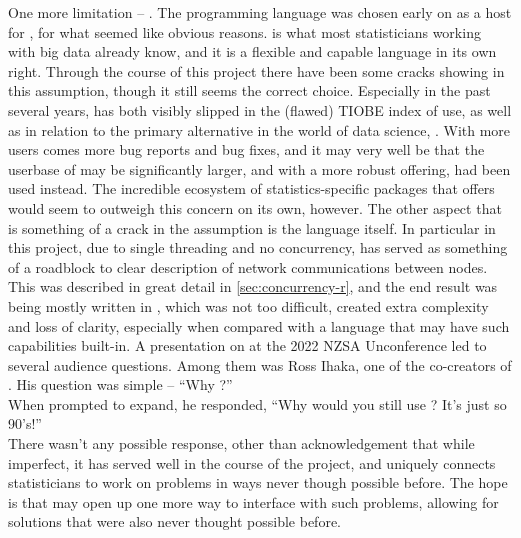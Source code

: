 One more limitation -- \R{}.
The \R{} programming language was chosen early on as a host for \lsr{}, for what seemed like obvious reasons.
\R{} is what most statisticians working with big data already know, and it is a flexible and capable language in its own right.
Through the course of this project there have been some cracks showing in this assumption, though it still seems the correct choice.
Especially in the past several years, \R{} has both visibly slipped in the (flawed) TIOBE index of use, as well as in relation to the primary alternative in the world of data science, .
With more users comes more bug reports and bug fixes, and it may very well be that the userbase of \lsr{} may be significantly larger, and with a more robust offering, had  been used instead.
The incredible ecosystem of statistics-specific packages that \R{} offers would seem to outweigh this concern on its own, however.
The other aspect that is something of a crack in the assumption is the language itself.
In particular in this project, due to single threading and no concurrency, \R{} has served as something of a roadblock to clear description of network communications between nodes.
This was described in great detail in \cref{sec:concurrency-r}, and the end result was \orcv{} being mostly written in , which was not too difficult, created extra complexity and loss of clarity, especially when compared with a language that may have such capabilities built-in.
A presentation on \lsr{} at the 2022 NZSA Unconference led to several audience questions.
Among them was Ross Ihaka, one of the co-creators of \R{}.
His question was simple -- ``Why \R{}?''\\
When prompted to expand, he responded, ``Why would you still use \R{}? It's just so 90's!''\\
There wasn't any possible response, other than acknowledgement that while imperfect, it has served well in the course of the project, and uniquely connects statisticians to work on problems in ways never though possible before.
The hope is that \lsr{} may open up one more way to interface with such problems, allowing for solutions that were also never thought possible before.
